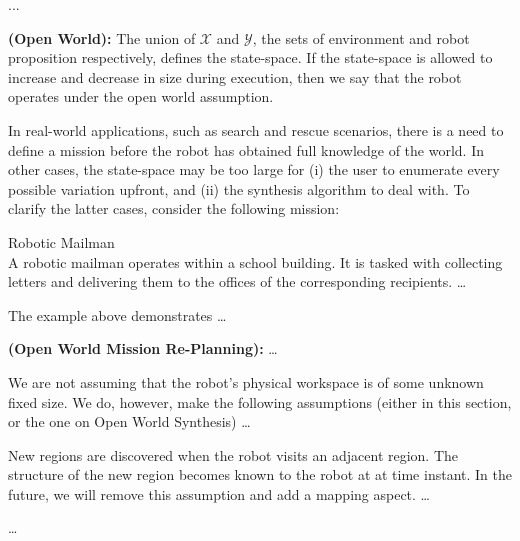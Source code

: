 ...

\begin{myDefinition}
	\textbf{(Open World):} The union of $\mathcal{X}$ and $\mathcal{Y}$, the sets of environment and robot proposition respectively, defines the state-space. If the state-space is allowed to increase and decrease in size during execution, then we say that the robot operates under the open world assumption.
\end{myDefinition}

In real-world applications, such as search and rescue scenarios, there is a need to define a mission before the robot has obtained full knowledge of the world. In other cases, the state-space may be too large for (i) the user to enumerate every possible variation upfront, and (ii) the synthesis algorithm to deal with. To clarify the latter cases, consider the following mission:

\begin{myExample}\label{Ex:mailman1} Robotic Mailman\\
	A robotic mailman operates within a school building. It is tasked with collecting letters and delivering them to the offices of the corresponding recipients. \ldots
\end{myExample}

The example above demonstrates \ldots

\begin{myProblem}
	\textbf{(Open World Mission Re-Planning):} \ldots
\end{myProblem}

We are not assuming that the robot's physical workspace is of some unknown fixed size. We do, however, make the following assumptions (either in this section, or the one on Open World Synthesis) \ldots

\begin{myAssumption}
	New regions are discovered when the robot visits an adjacent region. The structure of the new region becomes known to the robot at at time instant. In the future, we will remove this assumption and add a mapping aspect. \ldots
\end{myAssumption}

\begin{myAssumption}
	\ldots
\end{myAssumption}